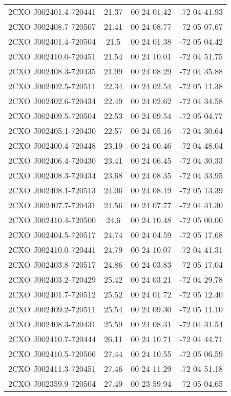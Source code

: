 \begin{table}
\begin{tabular}{cccc}
2CXO J002401.4-720441 & 21.37 & 00 24 01.42 & -72 04 41.93 \\
2CXO J002408.7-720507 & 21.41 & 00 24 08.77 & -72 05 07.67 \\
2CXO J002401.4-720504 & 21.5 & 00 24 01.38 & -72 05 04.42 \\
2CXO J002410.0-720451 & 21.54 & 00 24 10.01 & -72 04 51.75 \\
2CXO J002408.3-720435 & 21.99 & 00 24 08.29 & -72 04 35.88 \\
2CXO J002402.5-720511 & 22.34 & 00 24 02.54 & -72 05 11.38 \\
2CXO J002402.6-720434 & 22.49 & 00 24 02.62 & -72 04 34.58 \\
2CXO J002409.5-720504 & 22.53 & 00 24 09.54 & -72 05 04.77 \\
2CXO J002405.1-720430 & 22.57 & 00 24 05.16 & -72 04 30.64 \\
2CXO J002400.4-720448 & 23.19 & 00 24 00.46 & -72 04 48.04 \\
2CXO J002406.4-720430 & 23.41 & 00 24 06.45 & -72 04 30.33 \\
2CXO J002408.3-720434 & 23.68 & 00 24 08.35 & -72 04 33.95 \\
2CXO J002408.1-720513 & 24.06 & 00 24 08.19 & -72 05 13.39 \\
2CXO J002407.7-720431 & 24.56 & 00 24 07.77 & -72 04 31.30 \\
2CXO J002410.4-720500 & 24.6 & 00 24 10.48 & -72 05 00.00 \\
2CXO J002404.5-720517 & 24.74 & 00 24 04.59 & -72 05 17.68 \\
2CXO J002410.0-720441 & 24.79 & 00 24 10.07 & -72 04 41.31 \\
2CXO J002403.8-720517 & 24.86 & 00 24 03.83 & -72 05 17.04 \\
2CXO J002403.2-720429 & 25.42 & 00 24 03.21 & -72 04 29.78 \\
2CXO J002401.7-720512 & 25.52 & 00 24 01.72 & -72 05 12.40 \\
2CXO J002409.2-720511 & 25.54 & 00 24 09.30 & -72 05 11.10 \\
2CXO J002408.3-720431 & 25.59 & 00 24 08.31 & -72 04 31.54 \\
2CXO J002410.7-720444 & 26.11 & 00 24 10.71 & -72 04 44.71 \\
2CXO J002410.5-720506 & 27.44 & 00 24 10.55 & -72 05 06.59 \\
2CXO J002411.3-720451 & 27.46 & 00 24 11.29 & -72 04 51.18 \\
2CXO J002359.9-720504 & 27.49 & 00 23 59.94 & -72 05 04.65 \\

\end{tabular}
\end{table}
